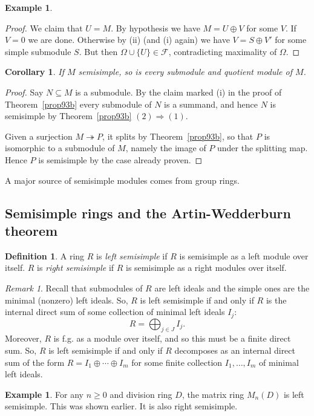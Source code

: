 \documentclass{amsart}[12pt]
\newcommand{\onto}{\twoheadrightarrow}
\def\sF{\mathscr  F}
\newcommand{\DEF}[1]{\emph{#1}\index{#1}}
\numberwithin{equation}{section}
\theoremstyle{plain} %
\newtheorem{cor}[equation]{Corollary}
\theoremstyle{definition}
\newtheorem{defn}[equation]{Definition}
\newtheorem{ex}[equation]{Example}
\theoremstyle{remark}
\newtheorem{rem}[equation]{Remark}
\begin{document}
\begin{ex}
\begin{proof}
We claim that $U=M$. By hypothesis we have $M = U \oplus V$ for some $V$. 
If $V = 0$ we are done. Otherwise by (ii) (and (i) again) we have $V = S \oplus V'$ for some simple submodule $S$. But then $\Omega \cup \{ U\} \in \sF$, contradicting maximality of $\Omega$.
\end{proof}


\begin{cor} \label{cor93}
If $M$  semisimple, so is every submodule and quotient module of $M$.
\end{cor}

\begin{proof} Say $N \subseteq M$ is a submodule. By the claim marked (i) in the proof of Theorem~\ref{prop93b} every submodule of $N$ is a summand, and hence $N$ is semisimple by Theorem~\ref{prop93b} $(2)\Rightarrow (1)$.
  
  Given a surjection $M \onto P$, it splits by Theorem~\ref{prop93b}, so that $P$ is isomorphic to a submodule of $M$, namely the image of $P$ under the splitting map. Hence $P$ is semisimple by the case already proven.
\end{proof}

A major source of semisimple modules comes from group rings.


\subsection{Semisimple rings and the Artin-Wedderburn theorem}

\begin{defn} A ring $R$ is \DEF{left semisimple} if  $R$ is semisimple as a left module over itself. 
$R$ is  \DEF{right semisimple} if $R$ is semisimple as a right modules over itself.
\end{defn}

\begin{rem}
Recall that submodules of $R$  are left ideals and the simple ones are the minimal (nonzero) left ideals. So, $R$ is left semisimple if and only if  $R$ is the internal direct sum of some collection of minimal left ideals $I_j$:
$$
R = \bigoplus_{j \in J} I_j.
$$
Moreover, $R$ is f.g. as a module over itself, and so this must be a {finite direct sum}. So, $R$ is left semisimple if and only if
$R$ decomposes as an internal direct sum of the form
$R = I_1 \oplus \cdots \oplus I_m$ for some finite collection $I_1, \dots, I_m$ of minimal left ideals.
\end{rem}

\begin{ex} For any $n \geq 0$ and division ring $D$, the matrix ring $M_n(D)$ is left semisimple.  This was shown earlier. It is also right semisimple. \end{ex}


\end{ex}
\end{document}
